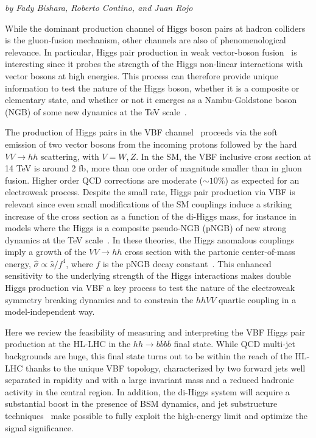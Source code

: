 \begin{center}
\textit{by Fady Bishara, Roberto Contino, and Juan Rojo}
\end{center}

%
While the dominant production channel of Higgs boson pairs at hadron colliders is the gluon-fusion mechanism, other channels are also of phenomenological relevance. In particular, Higgs pair production in weak vector-boson fusion~\cite{Bishara:2016kjn} is interesting since it probes the
strength of the  Higgs non-linear interactions with vector bosons at high
energies. This process can therefore provide unique information
to test the nature of the Higgs boson,
whether it is a composite or elementary state, and whether or not it emerges as
a Nambu-Goldstone boson (NGB) of some new dynamics at the TeV
scale~\cite{Giudice:2007fh,Contino:2010mh,Contino:2013gna}.

The production of Higgs pairs in the  VBF
channel~\cite{Giudice:2007fh,Contino:2010mh,Dolan:2013rja,Brooijmans:2014eja,Liu-Sheng:2014gxa,Dolan:2015zja} proceeds via the soft emission of two vector bosons from the incoming protons  followed by 
the hard $VV \to hh$ scattering, with $V=W,Z$.
%
In the SM, the VBF inclusive cross section
at 14 TeV is around 2 fb, more than one
order of magnitude smaller than in gluon fusion.
Higher order QCD corrections are moderate ($\sim 10\%$) as
expected for an electroweak process.
%
Despite the small rate, Higgs pair production via VBF is relevant since
even small modifications of the SM couplings induce a striking increase of the
cross section as a function of the di-Higgs mass, for instance in models 
where the Higgs is a composite pseudo-NGB (pNGB) of new strong dynamics at the TeV scale~\cite{Kaplan:1983fs}.
%
In these theories, the Higgs anomalous couplings imply a growth of the $VV\to hh$ cross section with the
partonic center-of-mass energy, $\hat{\sigma} \propto \hat s/f^4$, where $f$ is the pNGB decay constant~\cite{Giudice:2007fh}.
%
This enhanced sensitivity to the underlying strength of the Higgs interactions makes 
double Higgs production via VBF a key process to test the nature of the
electroweak symmetry breaking dynamics
and to constrain the $hhVV$ quartic coupling in a model-independent way.

Here we review the feasibility of measuring and interpreting
the VBF Higgs pair production at the HL-LHC in
 the $hh\to b\bar{b}b\bar{b}$ final state.
 While QCD multi-jet backgrounds are huge, this final state turns out
 to be within the reach of the HL-LHC thanks to the unique VBF topology,
characterized by two forward jets well separated in rapidity and with a large
invariant mass and a reduced hadronic activity in the central region. 
In addition, the di-Higgs system will acquire a substantial boost
in the presence of BSM dynamics, and jet
substructure techniques~\cite{Salam:2009jx,Gouzevitch:2013qca,Behr:2015oqq} 
make possible to fully exploit the
high-energy limit and optimize the signal significance.

